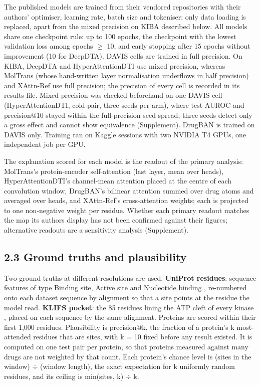 The published models are trained from their vendored repositories with their authors' optimiser, learning rate, batch size and tokeniser; only data loading is replaced, apart from the mixed precision on KIBA described below. All models share one checkpoint rule: up to 100 epochs, the checkpoint with the lowest validation loss among epochs $\geq$ 10, and early stopping after 15 epochs without improvement (10 for DeepDTA). DAVIS cells are trained in full precision. On KIBA, DeepDTA and HyperAttentionDTI use mixed precision, whereas MolTrans (whose hand-written layer normalisation underflows in half precision) and XAttn-Ref use full precision; the precision of every cell is recorded in its results file. Mixed precision was checked beforehand on one DAVIS cell (HyperAttentionDTI, cold-pair, three seeds per arm), where test AUROC and precision@10 stayed within the full-precision seed spread; three seeds detect only a gross effect and cannot show equivalence (Supplement). DrugBAN is trained on DAVIS only. Training ran on Kaggle sessions with two NVIDIA T4 GPUs, one independent job per GPU.

The explanation scored for each model is the readout of the primary analysis: MolTrans's protein-encoder self-attention (last layer, mean over heads), HyperAttentionDTI's channel-mean attention placed at the centre of each convolution window, DrugBAN's bilinear attention summed over drug atoms and averaged over heads, and XAttn-Ref's cross-attention weights; each is projected to one non-negative weight per residue. Whether each primary readout matches the map its authors display has not been confirmed against their figures; alternative readouts are a sensitivity analysis (Supplement).

\subsection{2.3 Ground truths and plausibility}\label{ground-truths-and-plausibility}

Two ground truths at different resolutions are used. \textbf{UniProt residues}: sequence features of type Binding site, Active site and Nucleotide binding \citep{UniProt2025}, re-numbered onto each dataset sequence by alignment so that a site points at the residue the model read. \textbf{KLIFS pocket}: the 85 residues lining the ATP cleft of every kinase \citep{vanLinden2014,Kanev2021}, placed on each sequence by the same alignment. Proteins are scored within their first 1,000 residues. Plausibility is precision@k, the fraction of a protein's k most-attended residues that are sites, with k = 10 fixed before any result existed. It is computed on one test pair per protein, so that proteins measured against many drugs are not weighted by that count. Each protein's chance level is (sites in the window) $\div$ (window length), the exact expectation for k uniformly random residues, and its ceiling is min(sites, k) $\div$ k.

